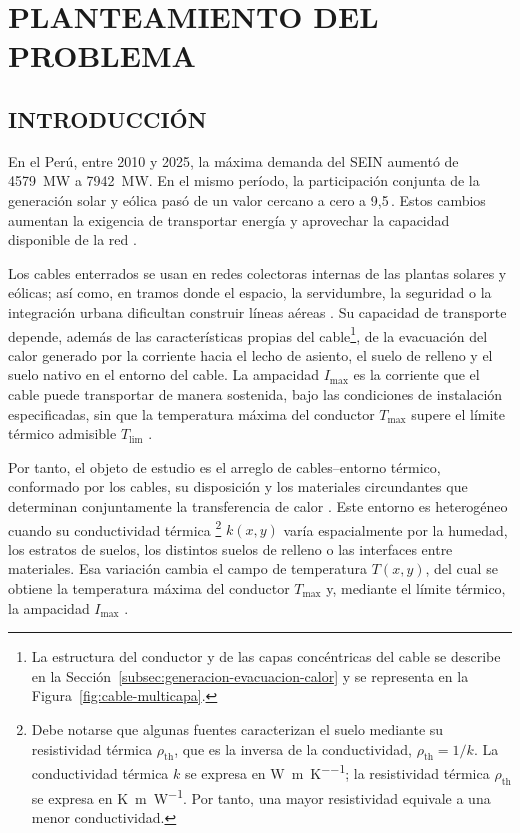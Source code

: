 \documentclass[11pt,a4paper,oneside]{report}
\newcommand{\Tmax}{T_{\max}}
\newcommand{\Imax}{I_{\max}}
\newcommand{\kx}{k(x,y)}
\newcommand{\rhoth}{\rho_{\mathrm{th}}}
\newcommand{\pct}{\mbox{\char37}}
\begin{document}
\clearpage
{}

\chapter{PLANTEAMIENTO DEL PROBLEMA}
\thispagestyle{empty}

\section{INTRODUCCIÓN}

En el Perú, entre 2010 y 2025, la máxima demanda del SEIN aumentó de \SI{4579}{\mega\watt} a \SI{7942}{\mega\watt}. En el mismo período, la participación conjunta de la generación solar y eólica pasó de un valor cercano a cero a 9,5\,\pct{}. Estos cambios aumentan la exigencia de transportar energía y aprovechar la capacidad disponible de la red \parencites{minem2025anuario2024}{minem2025indicadoresDiciembre}{coesMaximaDemanda}{iea2025transmissiongrid}.

Los cables enterrados se usan en redes colectoras internas de las plantas solares y eólicas; así como, en tramos donde el espacio, la servidumbre, la seguridad o la integración urbana dificultan construir líneas aéreas \parencite{cigre2023overheadLines}. Su capacidad de transporte depende, además de las características propias del cable\footnote{La estructura del conductor y de las capas concéntricas del cable se describe en la Sección~\ref{subsec:generacion-evacuacion-calor} y se representa en la Figura~\ref{fig:cable-multicapa}.}, de la evacuación del calor generado por la corriente hacia el lecho de asiento, el suelo de relleno y el suelo nativo en el entorno del cable. La ampacidad \(\Imax\) es la corriente que el cable puede transportar de manera sostenida, bajo las condiciones de instalación especificadas, sin que la temperatura máxima del conductor \(\Tmax\) supere el límite térmico admisible \(T_{\mathrm{lim}}\) \parencites[cláusulas~4--5]{iec60287}[3--5]{enescu2020}.

Por tanto, el objeto de estudio es el arreglo de cables--entorno térmico, conformado por los cables, su disposición y los materiales circundantes que determinan conjuntamente la transferencia de calor \parencites[1--3]{enescu2020}[41--42]{cigre2025}. Este entorno es heterogéneo cuando su conductividad térmica \footnote{Debe notarse que algunas fuentes caracterizan el suelo mediante su resistividad térmica \(\rhoth\), que es la inversa de la conductividad, \(\rhoth=1/k\). La conductividad térmica $k$ se expresa en \si{\watt\per\metre\per\kelvin}; la resistividad térmica $\rhoth$ se expresa en \si{\kelvin\metre\per\watt}. Por tanto, una mayor resistividad equivale a una menor conductividad.} \(\kx\) varía espacialmente por la humedad, los estratos de suelos, los distintos suelos de relleno o las interfaces entre materiales. Esa variación cambia el campo de temperatura \(T(x,y)\), del cual se obtiene la temperatura máxima del conductor \(\Tmax\) y, mediante el límite térmico, la ampacidad \(\Imax\) \parencites[3--4]{enescu2021}[1,6--7]{khumalo2025}[3]{xing2023}.
\end{document}
